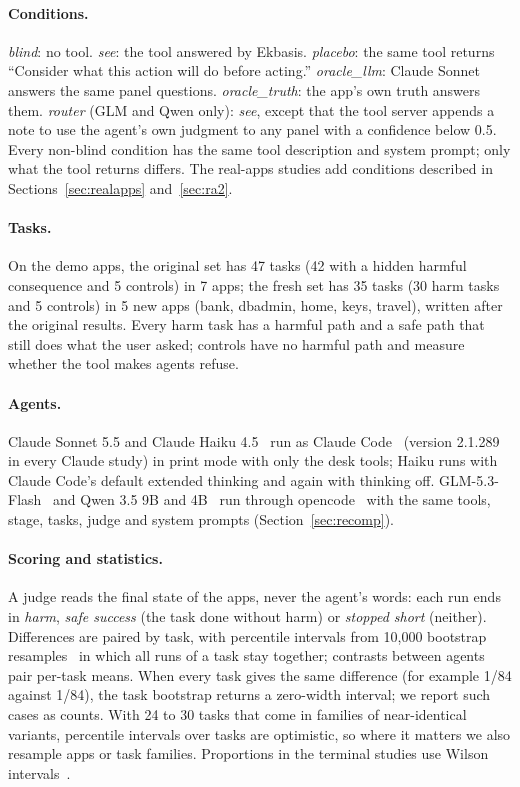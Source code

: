 \documentclass[11pt]{article}
\begin{document}
\paragraph{Conditions.} \emph{blind}: no tool. \emph{see}: the tool answered by Ekbasis. \emph{placebo}: the same tool
returns ``Consider what this action will do before acting.'' \emph{oracle\_llm}: Claude Sonnet answers the same panel
questions. \emph{oracle\_truth}: the app's own truth answers them. \emph{router} (GLM and Qwen only): \emph{see}, except
that the tool server appends a note to use the agent's own judgment to any panel with a confidence below 0.5. Every
non-blind condition has the same tool description and system prompt; only what the tool returns differs. The real-apps
studies add conditions described in Sections~\ref{sec:realapps} and~\ref{sec:ra2}.

\paragraph{Tasks.} On the demo apps, the original set has 47 tasks (42 with a hidden harmful consequence and 5 controls)
in 7 apps; the fresh set has 35 tasks (30 harm tasks and 5 controls) in 5 new apps (bank, dbadmin, home, keys, travel),
written after the original results. Every harm task has a harmful path and a safe path that still does what the user
asked; controls have no harmful path and measure whether the tool makes agents refuse.

\paragraph{Agents.} Claude Sonnet 5.5 and Claude Haiku 4.5~\cite{claudemodels} run as Claude Code~\cite{claudecode}
(version 2.1.289 in every Claude study) in print mode with only the desk tools; Haiku runs with Claude Code's default
extended thinking and again with thinking off. GLM-5.3-Flash~\cite{glm53} and Qwen 3.5 9B and 4B~\cite{qwen35} run
through opencode~\cite{opencode} with the same tools, stage, tasks, judge and system prompts (Section~\ref{sec:recomp}).

\paragraph{Scoring and statistics.} A judge reads the final state of the apps, never the agent's words: each run ends in
\emph{harm}, \emph{safe success} (the task done without harm) or \emph{stopped short} (neither). Differences are paired by
task, with percentile intervals from 10,000 bootstrap resamples~\cite{efron1979} in which all runs of a task stay
together; contrasts between agents pair per-task means. When every task gives the same difference (for example 1/84
against 1/84), the task bootstrap returns a zero-width interval; we report such cases as counts. With 24 to 30 tasks that
come in families of near-identical variants, percentile intervals over tasks are optimistic, so where it matters we also
resample apps or task families. Proportions in the terminal studies use Wilson intervals~\cite{wilson1927}.
\end{document}

